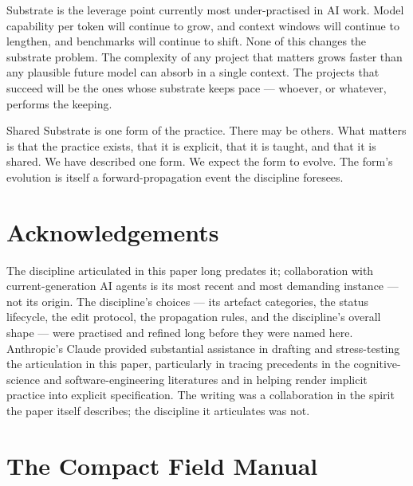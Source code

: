 \documentclass[11pt,a4paper,twocolumn]{article}
\begin{document}
Substrate is the leverage point currently most under-practised in
AI work. Model capability per token will continue to grow, and
context windows will continue to lengthen, and benchmarks will
continue to shift. None of this changes the substrate problem. The
complexity of any project that matters grows faster than any
plausible future model can absorb in a single context. The
projects that succeed will be the ones whose substrate keeps pace
--- whoever, or whatever, performs the keeping.

Shared Substrate is one form of the practice. There may be
others. What matters is that the practice exists, that it is
explicit, that it is taught, and that it is shared. We have
described one form. We expect the form to evolve. The form's
evolution is itself a forward-propagation event the discipline
foresees.

\section*{Acknowledgements}

The discipline articulated in this paper long predates it;
collaboration with current-generation AI agents is
its most recent and most demanding instance --- not its origin. The
discipline's choices --- its artefact categories, the status
lifecycle, the edit protocol, the propagation rules, and the
discipline's overall shape --- were practised and refined long
before they were named here. Anthropic's Claude provided substantial
assistance in drafting and stress-testing the articulation in this
paper, particularly in tracing precedents in the cognitive-science
and software-engineering literatures and in helping render implicit
practice into explicit specification. The writing was a
collaboration in the spirit the paper itself describes; the
discipline it articulates was not.




\appendix

\section{The Compact Field Manual}
\label{app:manual}
\end{document}

